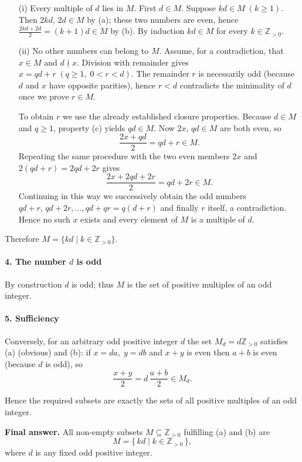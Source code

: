 \documentclass[12pt,a4paper]{article}
\theoremstyle{definition}
\begin{document}
\begin{enumerate}
\item[(i)] Every multiple of $d$ lies in $M$.
First $d \in M$.
Suppose $kd \in M\; (k \geq 1)$.
Then $2kd,\, 2d \in M$ by (a); these two numbers are even, hence
$\frac{2kd+2d}{2} = (k+1)d \in M$ by (b).
By induction $kd \in M$ for every $k \in \mathbb{Z}_{>0}$.

\item[(ii)] No other numbers can belong to $M$.
Assume, for a contradiction, that $x \in M$ and $d \nmid x$.
Division with remainder gives $x = qd + r\; (q \geq 1,\; 0 < r < d)$.
The remainder $r$ is necessarily odd (because $d$ and $x$ have opposite parities), hence $r < d$ contradicts the minimality of $d$ once we prove $r \in M$.

To obtain $r$ we use the already established closure properties.
Because $d \in M$ and $q \geq 1$, property (c) yields $qd \in M$. Now $2x,\, qd \in M$ are both even, so
\[
\frac{2x+qd}{2} = qd + r \in M.
\]
Repeating the same procedure with the two even members $2x$ and $2(qd+r) = 2qd + 2r$ gives
\[
\frac{2x+2qd+2r}{2} = qd + 2r \in M.
\]
Continuing in this way we successively obtain the odd numbers $qd+r,\, qd+2r, \dots, qd+qr = q(d+r)$ and finally $r$ itself, a contradiction. Hence no such $x$ exists and every element of $M$ is a multiple of $d$.
\end{enumerate}

Therefore $M = \{kd \mid k \in \mathbb{Z}_{>0}\}$.

\paragraph{4. The number $d$ is odd}
By construction $d$ is odd; thus $M$ is the set of positive multiples of an odd integer.

\paragraph{5. Sufficiency}
Conversely, for an arbitrary odd positive integer $d$ the set $M_d = d\mathbb{Z}_{>0}$ satisfies (a) (obvious) and (b):
if $x = da,\; y = db$ and $x+y$ is even then $a+b$ is even (because $d$ is odd), so
\[
\frac{x+y}{2} = d\,\frac{a+b}{2} \in M_d.
\]

Hence the required subsets are exactly the sets of all positive multiples of an odd integer.

\textbf{Final answer.}
All non-empty subsets $M \subseteq \mathbb{Z}_{>0}$ fulfilling (a) and (b) are
\[
M = \{\, kd \mid k \in \mathbb{Z}_{>0} \,\},
\]
where $d$ is any fixed odd positive integer.
\end{document}
